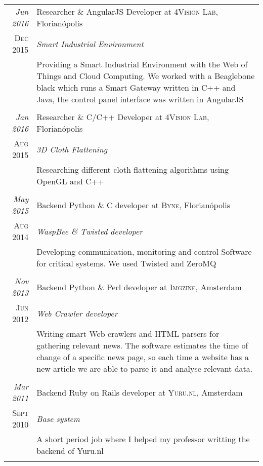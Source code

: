 \documentclass[a4paper,10pt]{article}
\begin{document}
\begin{longtable}{r|p{11cm}}
\emph{Jun 2016} & Researcher \& AngularJS Developer at \textsc{4Vision Lab}, Florianópolis \\\textsc{Dec 2015} & \emph{Smart Industrial Environment}\\&\footnotesize{Providing a Smart Industrial Environment with the Web of Things and Cloud Computing. We worked with a Beaglebone black which runs a Smart Gateway written in C++ and Java, the control panel interface was written in AngularJS}\\\multicolumn{2}{c}{} \\

\emph{Jan 2016} & Researcher \& C/C++ Developer at \textsc{4Vision Lab}, Florianópolis \\\textsc{Aug 2015} & \emph{3D Cloth Flattening}\\&\footnotesize{Researching different cloth flattening algorithms using OpenGL and C++}\\\multicolumn{2}{c}{} \\

\emph{May 2015} & Backend Python \& C developer at \textsc{Byne}, Florianópolis \\\textsc{Aug 2014} & \emph{WaspBee \& Twisted developer}\\&\footnotesize{Developing communication, monitoring and control Software for critical systems. We used Twisted and ZeroMQ}\\\multicolumn{2}{c}{} \\

\emph{Nov 2013} & Backend Python \& Perl developer at \textsc{Imgzine}, Amsterdam \\\textsc{Jun 2012} & \emph{Web Crawler developer}\\&\footnotesize{Writing smart Web crawlers and \textsc{HTML} parsers for gathering relevant news. The software estimates the time of change of a specific news page, so each time a website has a new article we are able to parse it and analyse relevant data.}\\\multicolumn{2}{c}{} \\

\emph{Mar 2011} & Backend Ruby on Rails developer at \textsc{Yuru.nl}, Amsterdam \\\textsc{Sept 2010} & \emph{Base system}\\&\footnotesize{A short period job where I helped my professor writting the backend of Yuru.nl}\\\multicolumn{2}{c}{} \\

\end{longtable}
\end{document}
